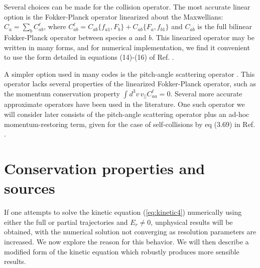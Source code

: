 \documentclass[12pt]{revtex4}
\begin{document}
Several choices can be made for the collision operator.
The most accurate linear option is the Fokker-Planck operator \cite{RMJ,PerBook}
linearized about the Maxwellians: $C_a = \sum_b C_{ab}^{\ell}$,
where $C_{ab}^{\ell} = C_{ab}\{f_{a1},F_{b}\} + C_{ab} \{ F_{a}, f_{b1}\}$
and $C_{ab}$ is the full bilinear Fokker-Planck operator between species $a$ and $b$.
This linearized operator may be written in many forms, and for numerical implementation,
we find it convenient to use the form detailed in equations (14)-(16) of Ref. \cite{speedGrids}.

A simpler option used in many codes is the pitch-angle scattering operator \cite{BeidlerBigBenchmarking}.
This operator lacks several properties of the linearized Fokker-Planck operator,
such as the momentum conservation property $\int d^3v \, v_{||} C_{aa}^{\ell}=0$.
Several more accurate approximate operators have been used in the literature.
One such operator we will consider later consists of the pitch-angle scattering operator
plus an ad-hoc momentum-restoring term, given for the case of self-collisions
by eq (3.69) in Ref. \cite{PerBook}.

\section{Conservation properties and sources}
\label{sec:sources}

If one attempts to solve the kinetic equation (\ref{eq:kinetic4}) numerically using either the full or partial trajectories
and $E_r \neq 0$, unphysical results will be obtained, with
the numerical solution not converging as resolution parameters are increased.
We now explore the reason for this behavior.
We will then describe a modified form of the kinetic equation which robustly produces more sensible results.
\end{document}
